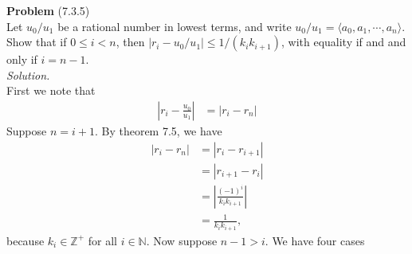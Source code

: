 \documentclass[12 pt]{amsart}
\begin{document}
\noindent
\textbf{Problem} (7.3.5) \\[4ex]
  Let $u_0/u_1$ be a rational number in lowest terms, and write
  $u_0 / u_1 = \langle a_0, a_1, \cdots, a_n \rangle$.
  Show that if $0 \leq i < n$, then 
  $|r_i - u_0 / u_1| \leq 1 / (k_i k_{i+1})$,
  with equality if and and only if $i = n - 1$.
\\[2ex]
\emph{Solution.} \\[2ex]
  First we note that 
  \begin{align*}
    \left| r_i - \frac{u_0}{u_1} \right|
    &= 
    \left| r_i - r_n \right|
  \end{align*}
  Suppose $n = i + 1$.
  By theorem 7.5, we have
  \begin{align*}
    \left| r_i - r_n \right|
    &=
      \left| r_i - r_{i+1} \right| \\
    &=
      \left| r_{i+1} - r_{i} \right| \\
    &=
      \left| \frac{(-1)^i}{k_i k_{i+1}} \right| \\
    &=
      \frac{1}{k_i k_{i+1}},
  \end{align*}
  because $k_i \in \mathbb{Z}^+$ for all $i \in \mathbb{N}$.
  Now suppose $n - 1 > i$.
  We have four cases
\end{document}
